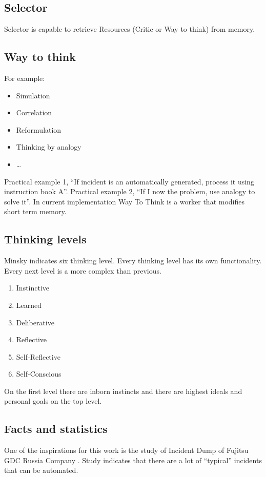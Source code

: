 \documentclass[12pt]{article}
\begin{document}
\subsection{Selector}
Selector is capable to retrieve Resources (Critic or Way to think) from memory.

\subsection{Way to think}

For example:
\begin{itemize}
 \item Simulation
 \item Correlation
 \item Reformulation
 \item Thinking by analogy
 \item …
\end{itemize}

Practical example 1, “If incident is an automatically generated, process it using instruction book A”.
Practical example 2, “If I now the problem, use analogy to solve it”. In current implementation Way To Think is a worker that modifies short term memory.

\subsection{Thinking levels}

Minsky indicates six thinking level. Every thinking level has its own functionality. Every next level is a more complex than previous.

\begin{enumerate}
 \item Instinctive
 \item Learned
 \item Deliberative
 \item Reflective
 \item Self-Reflective
 \item Self-Conscious
\end{enumerate}
On the first level there are inborn instincts and there are highest ideals and personal goals on the top level.

\subsection{Facts and statistics}
One of the inspirations for this work is the study of Incident Dump of Fujitsu GDC Russia Company . Study indicates that there are a lot of “typical” incidents that can be automated.
\end{document}

